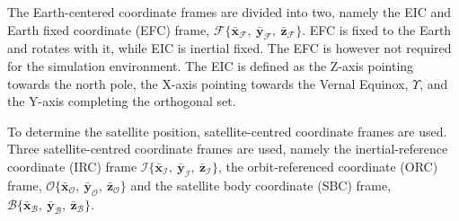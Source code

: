 The Earth-centered coordinate frames are divided into two, namely the EIC and Earth fixed coordinate (EFC) frame, $\mathcal{F}\{\bar{\mathbf{x}}_{\mathcal{F}},~\bar{\mathbf{y}}_{\mathcal{F}},~\bar{\mathbf{z}}_{\mathcal{F}}\}$. EFC is fixed to the Earth and rotates with it, while EIC is inertial fixed. The EFC is however not required for the simulation environment. The EIC is defined as the Z-axis pointing towards the north pole, the X-axis pointing towards the Vernal Equinox, $\Upsilon$, and the Y-axis completing the orthogonal set.


%
To determine the satellite position, satellite-centred coordinate frames are used. Three satellite-centred coordinate frames are used, namely the inertial-reference coordinate (IRC) frame $\mathcal{I}\{\bar{\mathbf{x}}_{\mathcal{I}},~\bar{\mathbf{y}}_{\mathcal{I}},~\bar{\mathbf{z}}_{\mathcal{I}}\}$, the orbit-referenced coordinate (ORC) frame, $\mathcal{O}\{\bar{\mathbf{x}}_{\mathcal{O}},~\bar{\mathbf{y}}_{\mathcal{O}},~\bar{\mathbf{z}}_{\mathcal{O}}\}$ and the satellite body coordinate (SBC) frame, $\mathcal{B}\{\bar{\mathbf{x}}_{\mathcal{B}},~\bar{\mathbf{y}}_{\mathcal{B}},~\bar{\mathbf{z}}_{\mathcal{B}}\}$. 
